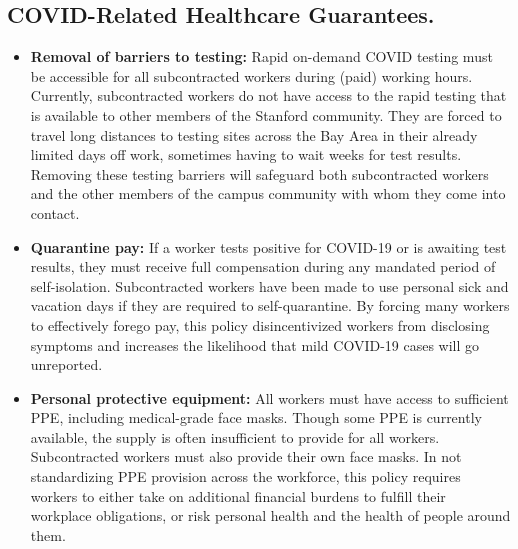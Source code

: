 \documentclass[12pt, titlepage, letterpaper]{article}
\begin{document}
\subsection*{COVID-Related Healthcare Guarantees.}
%
\begin{itemize}
    \item
    \textbf{Removal of barriers to testing:} Rapid on-demand COVID testing must be accessible for all subcontracted workers during (paid) working hours. Currently, subcontracted workers do not have access to the rapid testing that is available to other members of the Stanford community. They are forced to travel long distances to testing sites across the Bay Area in their already limited days off work, sometimes having to wait weeks for test results. Removing these testing barriers will safeguard both subcontracted workers and the other members of the campus community with whom they come into contact.
    \item 
    \textbf{Quarantine pay:} If a worker tests positive for COVID-19 or is awaiting test results, they must receive full compensation during any mandated period of self-isolation. Subcontracted workers have been made to use personal sick and vacation days if they are required to self-quarantine. By forcing many workers to effectively forego pay, this policy disincentivized workers from disclosing symptoms and increases the likelihood that mild COVID-19 cases will go unreported. 
    \item 
    \textbf{Personal protective equipment:} All workers must have access to sufficient PPE, including medical-grade face masks. Though some PPE is currently available, the supply is often insufficient to provide for all workers. Subcontracted workers must also provide their own face masks. In not standardizing PPE provision across the workforce, this policy requires workers to either take on additional financial burdens to fulfill their workplace obligations, or risk personal health and the health of people around them. 
    \end{itemize}

\vspace{-0.5em}
\end{document}
